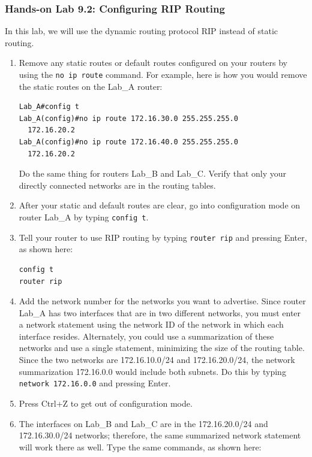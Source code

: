 \subsubsection[Hands-on Lab 9.2: Configuring RIP
Routing]{\texorpdfstring{\protect\hypertarget{c09.xhtmlux5cux23c09-sec-22}{}{}Hands-on
Lab 9.2: Configuring RIP
Routing}{Hands-on Lab 9.2: Configuring RIP Routing}}

In this lab, we will use the dynamic routing protocol RIP instead of
static routing.

\begin{enumerate}
\item
  Remove any static routes or default routes configured on your routers
  by using the \texttt{no\ ip\ route} command. For example, here is how
  you would remove the static routes on the Lab\_A router:

\begin{verbatim}
Lab_A#config t
Lab_A(config)#no ip route 172.16.30.0 255.255.255.0
  172.16.20.2
Lab_A(config)#no ip route 172.16.40.0 255.255.255.0
  172.16.20.2
\end{verbatim}

  Do the same thing for routers Lab\_B and Lab\_C. Verify that only your
  directly connected networks are in the routing tables.
\item
  After your static and default routes are clear, go into configuration
  mode on router Lab\_A by typing \texttt{config\ t}.
\item
  Tell your router to use RIP routing by typing \texttt{router\ rip} and
  pressing Enter, as shown here:

\begin{verbatim}
config t
router rip
\end{verbatim}
\item
  Add the network number for the networks you want to advertise. Since
  router Lab\_A has two interfaces that are in two different networks,
  you must enter a network statement using the network ID of the network
  in which each interface resides. Alternately, you could use a
  summarization of these networks and use a single statement, minimizing
  the size of the routing table. Since the two networks are
  172.16.10.0/24 and 172.16.20.0/24, the network summarization
  172.16.0.0 would include both subnets. Do this by typing
  \texttt{network\ 172.16.0.0} and pressing Enter.
\item
  Press Ctrl+Z to get out of configuration mode.
\item
  The interfaces on Lab\_B and Lab\_C are in the 172.16.20.0/24 and
  172.16.30.0/24 networks; therefore, the same summarized network
  statement will work there as well. Type the same commands, as shown
  here:


\end{enumerate}
